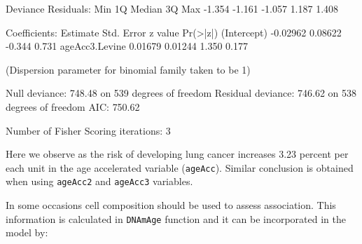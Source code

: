\documentclass[]{article}
\newcommand{\hlnum}[1]{\textcolor[rgb]{0.816,0.125,0.439}{#1}}%
\newcommand{\hlstr}[1]{\textcolor[rgb]{0.251,0.627,0.251}{#1}}%
\newcommand{\hlopt}[1]{\textcolor[rgb]{0,0,0}{#1}}%
\newcommand{\hlstd}[1]{\textcolor[rgb]{0.251,0.251,0.251}{#1}}%
\newcommand{\hlkwd}[1]{\textcolor[rgb]{0.878,0.439,0.125}{#1}}%
\newenvironment{Shaded}{\begin{myshaded}}{\end{myshaded}}
\newcommand{\KeywordTok}[1]{\hlkwd{#1}}
\newcommand{\DecValTok}[1]{\hlnum{#1}}
\newcommand{\FloatTok}[1]{\hlnum{#1}}
\newcommand{\StringTok}[1]{\hlstr{#1}}
\newcommand{\ControlFlowTok}[1]{\hlkwd{#1}}
\newcommand{\OperatorTok}[1]{\hlopt{#1}}
\newcommand{\ErrorTok}[1]{\textcolor{errorcolor}{#1}}
\newcommand{\NormalTok}[1]{\hlstd{#1}}
\begin{document}
\begin{Shaded}
\begin{Highlighting}[]
\NormalTok{  Deviance Residuals}\OperatorTok{:}\StringTok{ }
\StringTok{     }\NormalTok{Min      1Q  Median      3Q     Max  }
  \FloatTok{-1.354}  \FloatTok{-1.161}  \FloatTok{-1.057}   \FloatTok{1.187}   \FloatTok{1.408}  
  
\NormalTok{  Coefficients}\OperatorTok{:}
\StringTok{                 }\NormalTok{Estimate Std. Error z value }\KeywordTok{Pr}\NormalTok{(}\OperatorTok{>}\ErrorTok{|}\NormalTok{z}\OperatorTok{|}\NormalTok{)}
\NormalTok{  (Intercept)    }\FloatTok{-0.02962}    \FloatTok{0.08622}  \FloatTok{-0.344}    \FloatTok{0.731}
\NormalTok{  ageAcc3.Levine  }\FloatTok{0.01679}    \FloatTok{0.01244}   \FloatTok{1.350}    \FloatTok{0.177}
  
\NormalTok{  (Dispersion parameter }\ControlFlowTok{for}\NormalTok{ binomial family taken to be }\DecValTok{1}\NormalTok{)}
  
\NormalTok{      Null deviance}\OperatorTok{:}\StringTok{ }\FloatTok{748.48}\NormalTok{  on }\DecValTok{539}\NormalTok{  degrees of freedom}
\NormalTok{  Residual deviance}\OperatorTok{:}\StringTok{ }\FloatTok{746.62}\NormalTok{  on }\DecValTok{538}\NormalTok{  degrees of freedom}
\NormalTok{  AIC}\OperatorTok{:}\StringTok{ }\FloatTok{750.62}
  
\NormalTok{  Number of Fisher Scoring iterations}\OperatorTok{:}\StringTok{ }\DecValTok{3}
\end{Highlighting}
\end{Shaded}

Here we observe as the risk of developing lung cancer increases 3.23 percent per each unit in the age accelerated variable (\texttt{ageAcc}). Similar conclusion is obtained when using \texttt{ageAcc2} and \texttt{ageAcc3} variables.

In some occasions cell composition should be used to assess association. This information is calculated in \texttt{DNAmAge} function and it can be incorporated in the model by:
\end{document}
